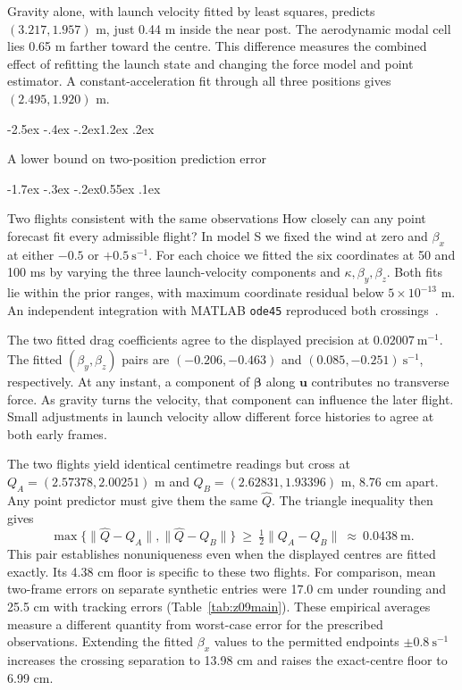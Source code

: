 \documentclass[11pt,letterpaper]{article}
\makeatletter
\renewcommand{\section}{\reserveheadroom\@startsection{section}{1}{\z@}
  {-2.5ex \@plus -.4ex \@minus -.2ex}{1.2ex \@plus .2ex}
  {\normalfont\Large\bfseries\color{black}\raggedright}}
\renewcommand{\subsection}{\reserveheadroom\@startsection{subsection}{2}{\z@}
  {-1.7ex \@plus -.3ex \@minus -.2ex}{0.55ex \@plus .1ex}
  {\normalfont\normalsize\sffamily\bfseries\color{black}\raggedright}}
\newcommand{\vv}[1]{\boldsymbol{#1}}
\newcommand{\norm}[1]{\lVert #1\rVert}
\newcommand{\reserveheadroom}{\par\ifdim\dimexpr\pagegoal-\pagetotal\relax<5\baselineskip\newpage\fi}
\makeatother
\begin{document}
Gravity alone, with launch velocity fitted by least squares, predicts \((3.217,1.957)\) m, just 0.44 m inside the near post. The aerodynamic modal cell lies 0.65 m farther toward the centre. This difference measures the combined effect of refitting the launch state and changing the force model and point estimator. A constant-acceleration fit through all three positions gives \((2.495,1.920)\) m.


\section{A lower bound on two-position prediction error}
\label{sec:ambig}

\subsection{Two flights consistent with the same observations}
How closely can any point forecast fit every admissible flight? In model S we fixed the wind at zero and \(\beta_x\) at either \(-0.5\) or \(+0.5\ \mathrm{s^{-1}}\). For each choice we fitted the six coordinates at 50 and 100 ms by varying the three launch-velocity components and \(\kappa,\beta_y,\beta_z\). Both fits lie within the prior ranges, with maximum coordinate residual below \(5\times10^{-13}\) m. An independent integration with MATLAB \texttt{ode45} reproduced both crossings~\cite{matlab}.

The two fitted drag coefficients agree to the displayed precision at \(0.02007\ \mathrm{m^{-1}}\). The fitted \((\beta_y,\beta_z)\) pairs are \((-0.206,-0.463)\) and \((0.085,-0.251)\ \mathrm{s^{-1}}\), respectively. At any instant, a component of \(\vv\beta\) along \(\vv u\) contributes no transverse force. As gravity turns the velocity, that component can influence the later flight. Small adjustments in launch velocity allow different force histories to agree at both early frames.

The two flights yield identical centimetre readings but cross at \(Q_A=(2.57378,2.00251)\) m and \(Q_B=(2.62831,1.93396)\) m, 8.76 cm apart. Any point predictor must give them the same \(\widehat Q\). The triangle inequality then gives
\begin{equation}
 \max\{\norm{\widehat Q-Q_A},\norm{\widehat Q-Q_B}\}
 \ \ge\ \tfrac12\norm{Q_A-Q_B}\ \approx\ 0.0438\ \mathrm{m}.
 \label{eq:witness}
\end{equation}
This pair establishes nonuniqueness even when the displayed centres are fitted exactly. Its 4.38 cm floor is specific to these two flights. For comparison, mean two-frame errors on separate synthetic entries were 17.0 cm under rounding and 25.5 cm with tracking errors (Table~\ref{tab:z09main}). These empirical averages measure a different quantity from worst-case error for the prescribed observations. Extending the fitted \(\beta_x\) values to the permitted endpoints \(\pm0.8\ \mathrm{s^{-1}}\) increases the crossing separation to 13.98 cm and raises the exact-centre floor to 6.99 cm.
\end{document}
